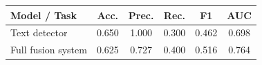 \begin{tabular}{lccccc}
\hline
Model / Task & Acc. & Prec. & Rec. & F1 & AUC \\
\hline
Text detector & 0.650 & 1.000 & 0.300 & 0.462 & 0.698 \\
Full fusion system & 0.625 & 0.727 & 0.400 & 0.516 & 0.764 \\
\hline
\end{tabular}